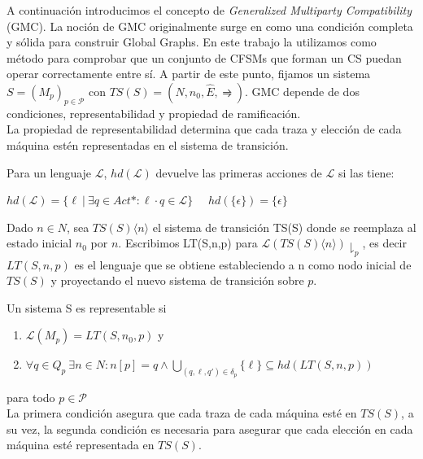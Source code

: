 A continuación introducimos el concepto de \emph{Generalized Multiparty Compatibility} (GMC). La noción de GMC originalmente surge en \cite{lange:popl15} como una condición completa y sólida para construir Global Graphs. En este trabajo la utilizamos como método para comprobar que un conjunto de CFSMs que forman un CS puedan operar correctamente entre sí. 
A partir de este punto, fijamos un sistema $S =(M_p)_{p \in \mathcal{P}} $ con $TS(S)= (N, n_0, \hat{E}, \rightrightharpoons)$. GMC depende de dos condiciones, representabilidad y propiedad de ramificación.\\    

La propiedad de representabilidad determina que cada traza y elección de cada máquina estén representadas en el sistema de transición.

\begin{definition}
Para un lenguaje $\mathcal{L}$, $hd(\mathcal{L})$ devuelve las primeras acciones de $\mathcal{L}$ si las tiene: 
\begin{center}
$hd(\mathcal{L})= \{\ell \ | \ \exists q \in Act*: \ell \cdot q \in \mathcal{L} \}$	\ \	 $hd(\{ \epsilon \}) = \{ \epsilon \}$
\end{center}
Dado $n \in N$, sea $ TS(S)\langle n \rangle$ el sistema de transición TS(S) donde se reemplaza al estado inicial $n_0$ por $n$. Escribimos LT(S,n,p) para $\mathcal{L}(TS(S)\langle n \rangle)\downharpoonright_p $, es decir $LT(S,n,p)$ es el lenguaje que se obtiene estableciendo a n como nodo inicial de $TS(S)$ y proyectando el nuevo sistema de transición sobre $p$.\\
\end{definition}

\begin{definition}[Representabilidad]
\label{def:representabilidad}
Un sistema S es representable si
\begin{enumerate}
\item $\mathcal{L}(M_p) = LT(S,n_0,p) $ y
\item $\forall q \in Q_p \ \exists n \in N: n[p] = q \land  \bigcup_{(q,\ell, q') \in \delta_p} \{ \ell \} \subseteq hd (LT(S,n,p))$
\end{enumerate}
para todo $p \in \mathcal{P} $ \\

La primera condición asegura que cada traza de cada máquina esté en $TS(S)$, a su vez, la segunda condición es necesaria para asegurar que cada elección en cada máquina esté representada en $TS(S)$.
\end{definition}

